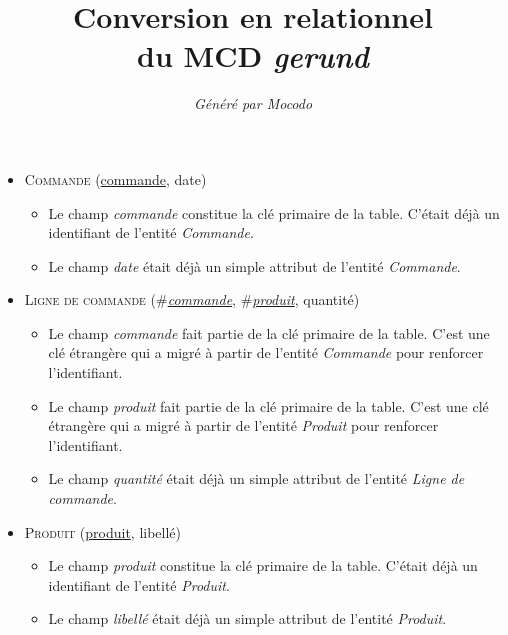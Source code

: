 \documentclass[a4paper]{article}
\title{Conversion en relationnel\\du MCD \emph{gerund}}
\author{\emph{Généré par Mocodo}}
\newcommand{\relat}[1]{\textsc{#1}}
\newcommand{\attr}[1]{#1}
\newcommand{\prim}[1]{\uline{#1}}
\newcommand{\foreign}[1]{\#\textsl{#1}}
\begin{document}
\maketitle

\begin{itemize}
  \item \relat{Commande} (\prim{commande}, \attr{date})
  \begin{itemize}
    \item Le champ \emph{commande} constitue la clé primaire de la table. C'était déjà un identifiant de l'entité \emph{Commande}.
    \item Le champ \emph{date} était déjà un simple attribut de l'entité \emph{Commande}.
  \end{itemize}

  \item \relat{Ligne de commande} (\foreign{\prim{commande}}, \foreign{\prim{produit}}, \attr{quantité})
  \begin{itemize}
    \item Le champ \emph{commande} fait partie de la clé primaire de la table. C'est une clé étrangère qui a migré à partir de l'entité \emph{Commande} pour renforcer l'identifiant.
    \item Le champ \emph{produit} fait partie de la clé primaire de la table. C'est une clé étrangère qui a migré à partir de l'entité \emph{Produit} pour renforcer l'identifiant.
    \item Le champ \emph{quantité} était déjà un simple attribut de l'entité \emph{Ligne de commande}.
  \end{itemize}

  \item \relat{Produit} (\prim{produit}, \attr{libellé})
  \begin{itemize}
    \item Le champ \emph{produit} constitue la clé primaire de la table. C'était déjà un identifiant de l'entité \emph{Produit}.
    \item Le champ \emph{libellé} était déjà un simple attribut de l'entité \emph{Produit}.
  \end{itemize}

\end{itemize}
\end{document}
